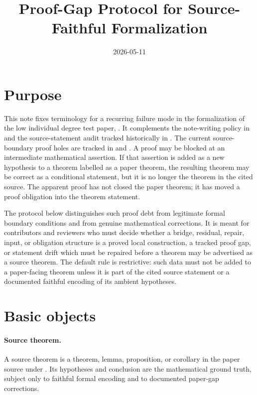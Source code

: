 \documentclass[11pt]{article}
\title{Proof-Gap Protocol for Source-Faithful Formalization}
\author{}
\date{2026-05-11}
\begin{document}
\maketitle

\section{Purpose}

This note fixes terminology for a recurring failure mode in the formalization
of the low individual degree test paper, .  It
complements the note-writing policy in  and
the source-statement audit tracked historically in .  The current
source-boundary proof holes are tracked in  and .
A proof may be blocked at
an intermediate mathematical assertion.  If that assertion is added as a new
hypothesis to a theorem labelled as a paper theorem, the resulting \Lean{}
theorem
may be correct as a conditional statement, but it is no longer the theorem in
the cited source.  The apparent proof has not closed the paper theorem; it has
moved a proof obligation into the theorem statement.

The protocol below distinguishes such proof debt from legitimate formal
boundary conditions and from genuine mathematical corrections.  It is meant for
contributors and reviewers who must decide whether a bridge, residual, repair,
input, or obligation structure is a proved local construction, a tracked proof
gap, or statement drift which must be repaired before a theorem may be
advertised as a source theorem.  The default rule is restrictive: such data
must not be added to a paper-facing theorem unless it is part of the cited
source statement or a documented faithful encoding of its ambient hypotheses.

\section{Basic objects}

\paragraph{Source theorem.}
A source theorem is a theorem, lemma, proposition, or corollary in the paper
source under .  Its hypotheses and conclusion are
the mathematical ground truth, subject only to faithful formal encoding and to
documented paper-gap corrections.
\end{document}
